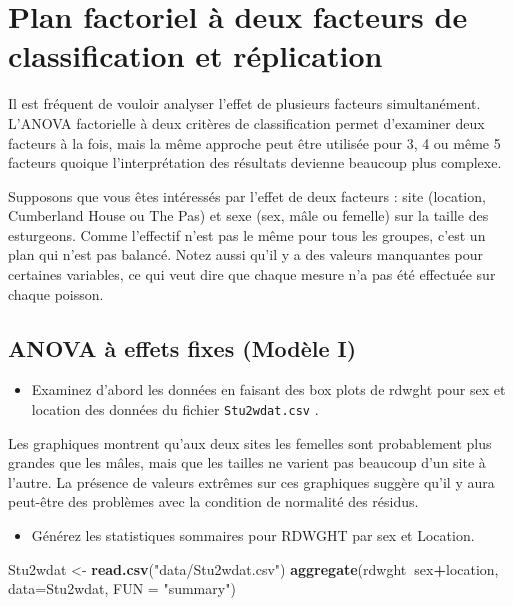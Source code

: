 \documentclass[12pt,]{book}
\newenvironment{Shaded}{\begin{snugshade}}{\end{snugshade}}
\newcommand{\DataTypeTok}[1]{\textcolor[rgb]{0.27,0.27,0.27}{#1}}
\newcommand{\KeywordTok}[1]{\textcolor[rgb]{0.27,0.27,0.27}{\textbf{#1}}}
\newcommand{\NormalTok}[1]{#1}
\newcommand{\OperatorTok}[1]{\textcolor[rgb]{0.43,0.43,0.43}{\textbf{#1}}}
\newcommand{\StringTok}[1]{\textcolor[rgb]{0.5,0.5,0.5}{#1}}
\providecommand{\tightlist}{%
  \setlength{\itemsep}{0pt}\setlength{\parskip}{0pt}}
\begin{document}
\hypertarget{plan-factoriel-uxe0-deux-facteurs-de-classification-et-ruxe9plication}{%
\section{Plan factoriel à deux facteurs de classification et réplication}\label{plan-factoriel-uxe0-deux-facteurs-de-classification-et-ruxe9plication}}

Il est fréquent de vouloir analyser l'effet de plusieurs facteurs simultanément. L'ANOVA factorielle à deux critères de classification permet d'examiner deux facteurs à la fois, mais la même approche peut être utilisée pour 3, 4 ou même 5 facteurs quoique l'interprétation des résultats devienne beaucoup plus complexe.

Supposons que vous êtes intéressés par l'effet de deux facteurs : site (location, Cumberland House ou The Pas) et sexe (sex, mâle ou femelle) sur la taille des esturgeons. Comme l'effectif n'est pas le même pour tous les groupes, c'est un plan qui n'est pas balancé. Notez aussi qu'il y a des valeurs manquantes pour certaines variables, ce qui veut dire que chaque mesure n'a pas été effectuée sur chaque poisson.

\hypertarget{anova-uxe0-effets-fixes-moduxe8le-i}{%
\subsection{ANOVA à effets fixes (Modèle I)}\label{anova-uxe0-effets-fixes-moduxe8le-i}}

\begin{itemize}
\tightlist
\item
  Examinez d'abord les données en faisant des box plots de rdwght pour sex et location des données du fichier \texttt{Stu2wdat.csv} .
\end{itemize}

Les graphiques montrent qu'aux deux sites les femelles sont probablement plus grandes que les mâles, mais que les tailles ne varient pas beaucoup d'un site à l'autre. La présence de valeurs extrêmes sur ces graphiques suggère qu'il y aura peut-être des problèmes avec la condition de normalité des résidus.

\begin{itemize}
\tightlist
\item
  Générez les statistiques sommaires pour RDWGHT par sex et Location.
\end{itemize}

\begin{Shaded}
\begin{Highlighting}[]
\NormalTok{Stu2wdat <-}\StringTok{ }\KeywordTok{read.csv}\NormalTok{(}\StringTok{"data/Stu2wdat.csv"}\NormalTok{)}
\KeywordTok{aggregate}\NormalTok{(rdwght}\OperatorTok{~}\NormalTok{sex}\OperatorTok{+}\NormalTok{location, }\DataTypeTok{data=}\NormalTok{Stu2wdat, }\DataTypeTok{FUN =} \StringTok{"summary"}\NormalTok{)}
\end{Highlighting}
\end{Shaded}
\end{document}
